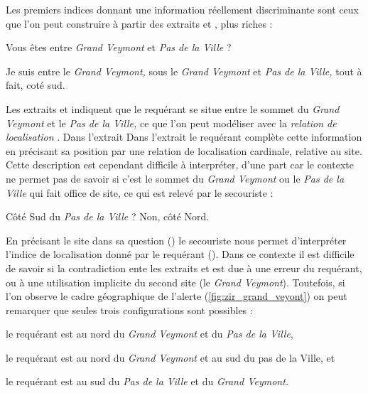 Les premiers indices donnant une information réellement discriminante
sont ceux que l'on peut construire à partir des extraits  et
, plus riches :
%
\begin{dialogue}
  \Sec {} Vous êtes entre \emph{Grand Veymont} et \emph{Pas de
la Ville} ?

\Req {} Je suis entre le \emph{Grand Veymont,}  sous le
\emph{Grand Veymont} et \emph{Pas de la Ville,} tout à fait, 
coté sud.
\end{dialogue}
%
Les extraits  et  indiquent que le requérant se
situe entre le sommet du \emph{Grand Veymont} et le \emph{Pas de la
  Ville,} ce que l'on peut modéliser avec la \emph{relation de
  localisation} .
%
Dans l'extrait  
%
Dans l'extrait  le requérant complète cette information en
précisant sa position par une relation de localisation cardinale,
relative au site.
%
Cette description est cependant difficile à interpréter, d'une part
car le contexte ne permet pas de savoir si c'est le sommet du
\emph{Grand Veymont} ou le \emph{Pas de la Ville} qui fait office de
site, ce qui est relevé par le secouriste :
%
\begin{dialogue}
  \Sec {} Côté Sud du \emph{Pas de la Ville} ?
%
  \Req {} Non, côté Nord.
\end{dialogue}
%
En précisant le site dans sa question () le secouriste nous
permet d'interpréter l'indice de localisation donné par le requérant
().
%
Dans ce contexte il est difficile de savoir si la contradiction ente
les extraits  et  est due à une erreur du requérant,
ou à une utilisation implicite du second site (le \emph{Grand
  Veymont}). Toutefois, si l'on observe le cadre géographique de
l'alerte (\autoref{fig:zir_grand_veyont}) on peut remarquer que seules
trois configurations sont possibles :
%
\begin{enumerate*}[label=(\arabic*)]
\item le requérant est au nord du \emph{Grand Veymont} et du \emph{Pas
    de la Ville},
\item le requérant est au nord du \emph{Grand Veymont} et au sud du
  pas de la Ville, et
\item le requérant est au sud du \emph{Pas de la Ville} et du
  \emph{Grand Veymont.}
\end{enumerate*}
%

